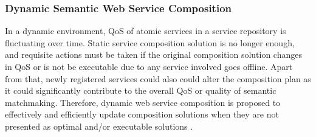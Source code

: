 \subsubsection{Dynamic Semantic Web Service Composition}
In a dynamic environment, QoS of atomic services in a service repository is fluctuating over time. Static service composition solution is no longer enough, and requisite actions must be taken if the original composition solution changes in QoS or is not be executable due to any service involved goes offline. Apart from that, newly registered services could also could alter the composition plan as it could significantly contribute to the overall QoS or quality of semantic matchmaking. Therefore, dynamic web service composition is proposed to effectively and efficiently update composition solutions when they are not presented as optimal and/or executable solutions \cite{li2014fault}. 


